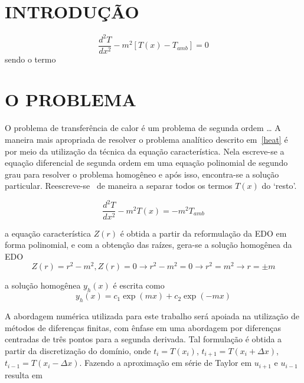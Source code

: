 \documentclass[a4paper, 12pt]{article}
\begin{document}
\vspace{0.5cm}

\section{INTRODUÇÃO}


\begin{equation}
  \label{heat}
  \frac{d^2 T}{dx^2} - m^2 [T(x) - T_{amb}] = 0
\end{equation}
sendo o termo

\section{O PROBLEMA}

O problema de transferência de calor é um problema de segunda ordem \ldots
A maneira mais apropriada de resolver o problema analítico descrito em~\ref{heat} é por meio da utilização da técnica da equação característica. Nela escreve-se a equação diferencial de segunda
ordem em uma equação polinomial de segundo grau para resolver o problema homogêneo e após isso, encontra-se a solução particular. Reescreve-se~\label{heat} de maneira a separar todos os termos $T(x)$ do
`resto'.

\begin{equation}
  \label{heatmodified}
  \frac{d^2 T}{dx^2} - m^2 T(x) = - m^2 T_{amb} 
\end{equation}

a equação característica $Z(r)$ é obtida a partir da reformulação da EDO em forma polinomial, e com a obtenção das raízes, gera-se a solução homogênea da EDO 
\begin{equation}
  \label{caracter}
  Z(r) = r^2 - m^2, Z(r) = 0  \rightarrow  r^2 - m^2 = 0 \rightarrow  r^2 = m^2 \rightarrow  r = \pm m 
\end{equation}

a solução homogênea $y_{h}(x)$ é escrita como 
\begin{equation}
  \label{homogenous}
  y_{h}(x) = c_1 \exp(mx) + c_2 \exp(-mx)
\end{equation}


A abordagem numérica utilizada para este trabalho será apoiada na utilização de métodos de diferenças finitas, com ênfase em uma abordagem por diferenças centradas de três pontos para a 
segunda derivada. 
Tal formulação é obtida a partir da discretização do domínio, onde $t_i = T(x_i)$, $t_{i+1} = T(x_i + \Delta x)$, $t_{i-1} = T(x_i - \Delta x)$. 
Fazendo a aproximação em série de Taylor em $u_{i+1}$ e $u_{i-1}$ resulta em 
\end{document}
